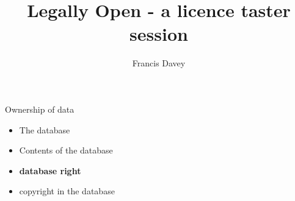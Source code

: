 \documentclass{beamer}
\title{Legally Open - a licence taster session}
\author{Francis Davey}
\begin{document}
\begin{frame}
  \titlepage
\end{frame}

%
%

\begin{frame}{Ownership of data}

  \begin{itemize}
  \item The database
  \item Contents of the database
  \end{itemize}
\end{frame}

\begin{frame}
  
\end{frame}
\begin{itemize}
\item {\bf database right} 
\item copyright in the database
\end{itemize}
\end{document}
